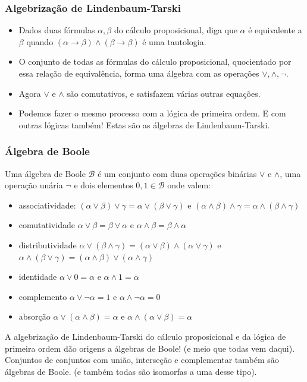 \begin{frame}{}
\frametitle{Algebrização de Lindenbaum-Tarski}
\pause
\begin{itemize}
    \item Dados duas fórmulas $\alpha, \beta$ do cálculo proposicional, diga que $\alpha$ é equivalente a $\beta$ quando $(\alpha \rightarrow \beta) \wedge (\beta \rightarrow \beta)$ é uma tautologia. \pause
    \item O conjunto de todas as fórmulas do cálculo proposicional, quocientado por essa relação de equivalência, forma uma álgebra com as operações $\vee, \wedge, \lnot$. \pause
    \item Agora $\vee$ e $\wedge$ são comutativos, e satisfazem várias outras equações. \pause
    \item Podemos fazer o mesmo processo com a lógica de primeira ordem. E com outras lógicas também! Estas são as álgebras de Lindenbaum-Tarski.
\end{itemize}

\end{frame}

\begin{frame}{}
\frametitle{Álgebra de Boole}
\pause
Uma álgebra de Boole $\mathcal{B}$ é um conjunto com duas operações binárias $\vee$ e $\wedge$, uma operação unária $\lnot$ e dois elementos $0,1 \in \mathcal{B}$ onde valem: \pause
\begin{itemize}
    \item associatividade: $(\alpha \vee \beta) \vee \gamma = \alpha \vee (\beta \vee \gamma)$ e $(\alpha \wedge \beta) \wedge \gamma = \alpha \wedge (\beta \wedge \gamma)$ \pause
    \item comutatividade $\alpha \vee \beta = \beta \vee \alpha$ e $\alpha \wedge \beta = \beta \wedge \alpha$ \pause
    \item distributividade $\alpha \vee (\beta \wedge \gamma) = (\alpha \vee \beta) \wedge (\alpha \vee \gamma)$ e $\alpha \wedge (\beta \vee \gamma) = (\alpha \wedge \beta) \vee (\alpha \wedge \gamma)$ \pause
    \item identidade $\alpha \vee 0 = \alpha$ e $\alpha \wedge 1 = \alpha$ \pause
    \item complemento $\alpha \vee \lnot \alpha = 1$ e $\alpha \wedge \lnot \alpha = 0$ \pause
    \item absorção $\alpha \vee (\alpha \wedge \beta) = \alpha$ e $\alpha \wedge (\alpha \vee \beta) = \alpha$ \pause
\end{itemize}
A algebrização de Lindenbaum-Tarski do cálculo proposicional e da lógica de primeira ordem dão origens a álgebras de Boole! \pause (e meio que todas vem daqui). \pause
Conjuntos de conjuntos com união, interseção e complementar também são álgebras de Boole. \pause (e também todas são isomorfas a uma desse tipo).
\end{frame}

